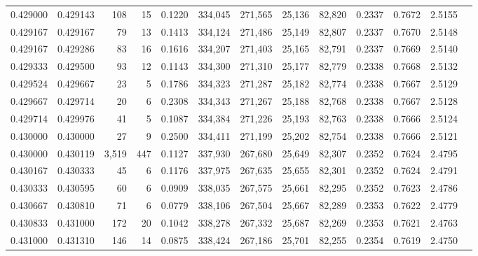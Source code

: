 \begin{tabular}{rrrrrrrrrrrrr}
0.429000 & 0.429143 &   108 &  15 &                                     0.1220 & 334,045 & 271,565 &  25,136 &  82,820 & 0.2337 & 0.7672 & 2.5155 \\
0.429167 & 0.429167 &    79 &  13 &                                     0.1413 & 334,124 & 271,486 &  25,149 &  82,807 & 0.2337 & 0.7670 & 2.5148 \\
0.429167 & 0.429286 &    83 &  16 &                                     0.1616 & 334,207 & 271,403 &  25,165 &  82,791 & 0.2337 & 0.7669 & 2.5140 \\
0.429333 & 0.429500 &    93 &  12 &                                     0.1143 & 334,300 & 271,310 &  25,177 &  82,779 & 0.2338 & 0.7668 & 2.5132 \\
0.429524 & 0.429667 &    23 &   5 &                                     0.1786 & 334,323 & 271,287 &  25,182 &  82,774 & 0.2338 & 0.7667 & 2.5129 \\
0.429667 & 0.429714 &    20 &   6 &                                     0.2308 & 334,343 & 271,267 &  25,188 &  82,768 & 0.2338 & 0.7667 & 2.5128 \\
0.429714 & 0.429976 &    41 &   5 &                                     0.1087 & 334,384 & 271,226 &  25,193 &  82,763 & 0.2338 & 0.7666 & 2.5124 \\
0.430000 & 0.430000 &    27 &   9 &                                     0.2500 & 334,411 & 271,199 &  25,202 &  82,754 & 0.2338 & 0.7666 & 2.5121 \\
0.430000 & 0.430119 & 3,519 & 447 &                                     0.1127 & 337,930 & 267,680 &  25,649 &  82,307 & 0.2352 & 0.7624 & 2.4795 \\
0.430167 & 0.430333 &    45 &   6 &                                     0.1176 & 337,975 & 267,635 &  25,655 &  82,301 & 0.2352 & 0.7624 & 2.4791 \\
0.430333 & 0.430595 &    60 &   6 &                                     0.0909 & 338,035 & 267,575 &  25,661 &  82,295 & 0.2352 & 0.7623 & 2.4786 \\
0.430667 & 0.430810 &    71 &   6 &                                     0.0779 & 338,106 & 267,504 &  25,667 &  82,289 & 0.2353 & 0.7622 & 2.4779 \\
0.430833 & 0.431000 &   172 &  20 &                                     0.1042 & 338,278 & 267,332 &  25,687 &  82,269 & 0.2353 & 0.7621 & 2.4763 \\
0.431000 & 0.431310 &   146 &  14 &                                     0.0875 & 338,424 & 267,186 &  25,701 &  82,255 & 0.2354 & 0.7619 & 2.4750 \\

\end{tabular}
